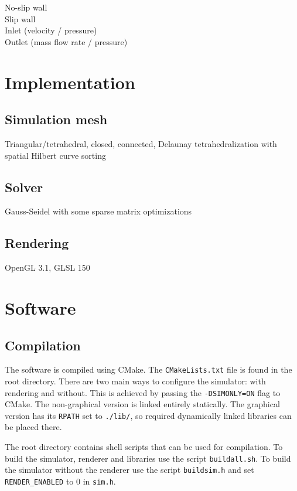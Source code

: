 \documentclass[12pt]{article}
\begin{document}
\noindent

No-slip wall\\

Slip wall\\

Inlet (velocity / pressure)\\

Outlet (mass flow rate / pressure)\\

\section{Implementation}

\subsection{Simulation mesh}

Triangular/tetrahedral, closed, connected, Delaunay tetrahedralization with spatial Hilbert curve sorting

\subsection{Solver}

Gauss-Seidel with some sparse matrix optimizations

\subsection{Rendering}

OpenGL 3.1, GLSL 150

\section{Software}

\subsection{Compilation}

The software is compiled using CMake. The \verb|CMakeLists.txt| file is found in the root directory. There are two main ways to configure the simulator: with rendering and without. This is achieved by passing the \verb|-DSIMONLY=ON| flag to CMake. The non-graphical version is linked entirely statically. The graphical version has its \verb|RPATH| set to \verb|./lib/|, so required dynamically linked libraries can be placed there.

The root directory contains shell scripts that can be used for compilation. To build the simulator, renderer and libraries use the script \verb|buildall.sh|. To build the simulator without the renderer use the script \verb|buildsim.h| and set \verb|RENDER_ENABLED| to 0 in \verb|sim.h|.\\
\end{document}
